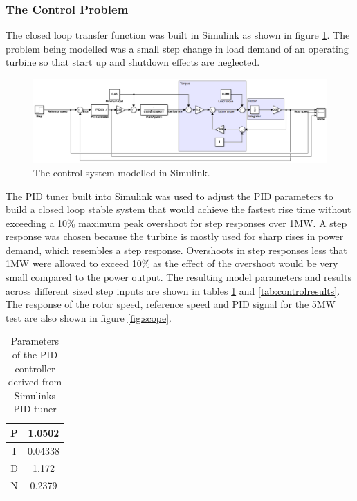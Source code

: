  \begin{landscape}
\subsubsection{The Control Problem}
The closed loop transfer function was built in Simulink as shown in figure \ref{fig:controlsimulink}. The problem being modelled was a  small step change in load demand of an operating turbine so that start up and shutdown effects are neglected. 
\begin{figure} [h]
\centering
\includegraphics[width=1\textwidth]{./pictures/controlsimulink.png}
 \caption{The control system modelled in Simulink.} \label{fig:controlsimulink} 
 \end{figure}
 The PID tuner built into Simulink was used to adjust the PID parameters to build a closed loop stable system that would achieve the fastest rise time without exceeding a 10\% maximum peak overshoot for step responses over 1MW. A step response was chosen because the turbine is mostly used for sharp rises in power demand, which resembles a step response. Overshoots in step responses less that 1MW were allowed to exceed 10\% as the effect of the overshoot would be very small compared to the power output. The resulting model parameters and results across different sized step inputs are shown in tables \ref{tab:PID} and \ref{tab:controlresults}. The response of the rotor speed, reference speed and PID signal for the 5MW test are also shown in figure \ref{fig:scope}. 
 \end{landscape}

 \begin {table} [h]
\begin{center}
\caption{Parameters of the PID controller derived from Simulinks PID tuner} \label{tab:PID} 
\begin{tabular}{ |c|c| }
 \hline
  P & 1.0502\\ 
 \hline
  I & 0.04338\\ 
  \hline
  D & 1.172\\ 
 \hline
 N & 0.2379\\
 \hline
\end{tabular}
\end{center}  
\end {table}


